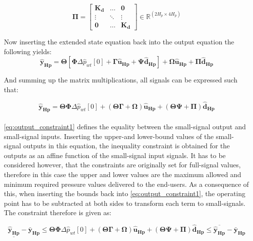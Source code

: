  \begin{equation}
 \bm{\Pi} =
 \begin{bmatrix}
 \bm{K_d} & \hdots & \bm{0} \\
 \vdots & \ddots & \vdots\\
 \bm{0} & \hdots & \bm{K_d} 
 \end{bmatrix}
 \in \pmb{\mathbb{R}}^{(2 H_p \times 4 H_p)}
 \end{equation}


Now inserting the extended state equation back into the output equation the following yields: 
\begin{equation}
	\bm{\hat{y}_{Hp}} = \bm{\Theta} [\bm{\Phi} \Delta \hat{p}_{wt}[0] + \bm{\Gamma} \bm{\hat{u}_{Hp}} + \bm{\Psi} \bm{\hat{d}_{Hp}}] + \bm{\Omega} \bm{\hat{u}_{Hp}} + \bm{\Pi} \bm{\hat{d}_{Hp}}
\end{equation}

And summing up the matrix multiplications, all signals can be expressed such that: 

\begin{equation}
	\bm{\hat{y}_{Hp}} = \bm{\Theta} \bm{\Phi} \Delta \hat{p}_{wt}[0] +  (\bm{\Theta} \bm{\Gamma}+ \bm{\Omega}) \bm{\hat{u}_{Hp}} + (\bm{\Theta} \bm{\Psi} + \bm{\Pi})  \bm{\hat{d}_{Hp}}
	\label{eq:output_constraint1}
\end{equation}
\\
\eqref{eq:output_constraint1} defines the equality between the small-signal output and small-signal inputs. Inserting the upper-and lower-bound values of the small-signal outputs in this equation, the inequality constraint is obtained for the outputs as an affine function of the small-signal input signals. It has to be considered however, that the constraints are originally set for full-signal values, therefore in this case the upper and lower values are the maximum allowed and minimum required pressure values delivered to the end-users. As a consequence of this, when inserting the bounds back into \eqref{eq:output_constraint1}, the operating point has to be subtracted at both sides to transform each term to small-signals. The constraint therefore is given as: 

\begin{equation}
	\underline{\bm{\hat{y}_{Hp}}} - \bm{\bar{y}_{Hp}} \leq \bm{\Theta} \bm{\Phi} \Delta \hat{p}_{wt}[0] +  (\bm{\Theta} \bm{\Gamma}+ \bm{\Omega}) \bm{\hat{u}_{Hp}} + (\bm{\Theta} \bm{\Psi} + \bm{\Pi})  \bm{\hat{d}_{Hp}} \leq \overline{\bm{\hat{y}_{Hp}}} - \bm{\bar{y}_{Hp}}
	\label{eq:output_constraint2}
\end{equation}

